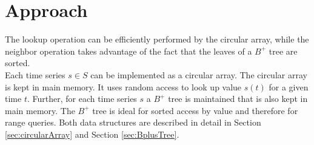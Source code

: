\documentclass[abstracton,12pt]{scrreprt}
\begin{document}
\chapter{Approach}
\label{sec:Approach}
The lookup operation can be efficiently performed by the circular array, while the neighbor operation takes advantage of the fact that the leaves of a $B^+$ tree are sorted. \\
Each time series $s \in S$ can be implemented as a circular array. The circular array is kept in main memory. It uses random access to look up value $s(t)$ for a given time $t$. Further, for each time series $s$ a $B^+$ tree is maintained that is also kept in main memory. The $B^+$ tree is ideal for sorted access by value and therefore for range queries. Both data structures are described in detail in Section \ref{sec:circularArray} and Section \ref{sec:BplusTree}.
\end{document}
